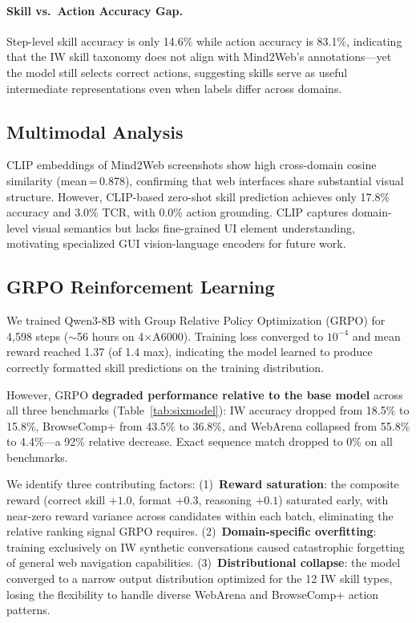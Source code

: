 \documentclass{article}
\begin{document}
\paragraph{Skill vs.\ Action Accuracy Gap.} Step-level skill accuracy is only 14.6\% while action accuracy is 83.1\%, indicating that the IW skill taxonomy does not align with Mind2Web's annotations---yet the model still selects correct actions, suggesting skills serve as useful intermediate representations even when labels differ across domains.

\subsection{Multimodal Analysis}

CLIP embeddings of Mind2Web screenshots show high cross-domain cosine similarity (mean\,=\,0.878), confirming that web interfaces share substantial visual structure. However, CLIP-based zero-shot skill prediction achieves only 17.8\% accuracy and 3.0\% TCR, with 0.0\% action grounding. CLIP captures domain-level visual semantics but lacks fine-grained UI element understanding, motivating specialized GUI vision-language encoders for future work.

\subsection{GRPO Reinforcement Learning}
\label{sec:results_grpo}

We trained Qwen3-8B with Group Relative Policy Optimization (GRPO) for 4,598 steps ($\sim$56 hours on 4$\times$A6000). Training loss converged to $10^{-4}$ and mean reward reached 1.37 (of 1.4 max), indicating the model learned to produce correctly formatted skill predictions on the training distribution.

However, GRPO \textbf{degraded performance relative to the base model} across all three benchmarks (Table~\ref{tab:sixmodel}): IW accuracy dropped from 18.5\% to 15.8\%, BrowseComp+ from 43.5\% to 36.8\%, and WebArena collapsed from 55.8\% to 4.4\%---a 92\% relative decrease. Exact sequence match dropped to 0\% on all benchmarks.

We identify three contributing factors: (1)~\textbf{Reward saturation}: the composite reward (correct skill $+1.0$, format $+0.3$, reasoning $+0.1$) saturated early, with near-zero reward variance across candidates within each batch, eliminating the relative ranking signal GRPO requires. (2)~\textbf{Domain-specific overfitting}: training exclusively on IW synthetic conversations caused catastrophic forgetting of general web navigation capabilities. (3)~\textbf{Distributional collapse}: the model converged to a narrow output distribution optimized for the 12 IW skill types, losing the flexibility to handle diverse WebArena and BrowseComp+ action patterns.
\end{document}
